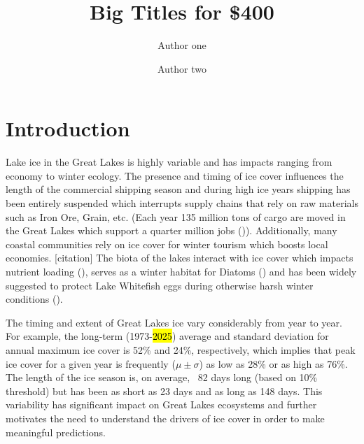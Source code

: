 \documentclass{article}
\title{Big Titles for \$400}
\author[1]{Author one}
\author[2]{Author two}
\date{}
\affil[1]{NOAA Great Lakes Environmental Research Lab, Ann Arbor, MI}
\affil[2]{Cooperative Institute for Great Lakes Research, University of Michigan, Ann Arbor, MI}
\begin{document}
\maketitle

\begin{abstract}

\end{abstract}


\section{Introduction}

Lake ice in the Great Lakes is highly variable and has impacts ranging from economy to winter ecology. The presence and timing of ice cover influences the length of the commercial shipping season and during high ice years shipping has been entirely suspended which interrupts supply chains that rely on raw materials such as Iron Ore, Grain, etc. (Each year 135 million tons of cargo are moved in the Great Lakes which support a quarter million jobs (\cite{Martin_2023})). Additionally, many coastal communities rely on ice cover for winter tourism which boosts local economies. [citation] The biota of the lakes interact with ice cover which impacts nutrient loading (\cite{Nicholls_1998}), serves as a winter habitat for Diatoms (\cite{Twiss_2012}) and has been widely suggested to protect Lake Whitefish eggs during otherwise harsh winter conditions (\cite{Brown_1993, Lynch_2015, Collingsworth_2017}).

The timing and extent of Great Lakes ice vary considerably from year to year. For example, the long-term (1973-\hl{2025}) average and standard deviation for annual maximum ice cover is 52\% and  24\%, respectively, which implies that peak ice cover for a given year is frequently ($\mu \pm \sigma$) as low as 28\% or as high as 76\%.  The length of the ice season is, on average, ~82 days long (based on 10\% threshold) but has been as short as 23 days and as long as 148 days. This variability has significant impact on Great Lakes ecosystems and further motivates the need to understand the drivers of ice cover in order to make meaningful predictions. 
\end{document}
